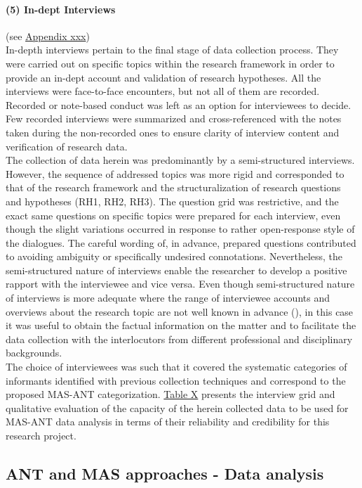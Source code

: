 \documentclass[11pt]{report}
\begin{document}
\paragraph{(5) In-dept Interviews}
(see \href{}{Appendix xxx})
\\
In-depth interviews pertain to the final stage of data collection process. They were carried out on specific topics within the research framework in order to provide an in-dept account and validation of research hypotheses. All the interviews were face-to-face encounters, but not all of them are recorded. Recorded or note-based conduct was left as an option for interviewees to decide. Few recorded interviews were summarized and cross-referenced with the notes taken during the non-recorded ones to ensure clarity of interview content and verification of research data.
\\
The collection of data herein was predominantly by a semi-structured interviews. However, the sequence of addressed topics was more rigid and corresponded to that of the research framework and the structuralization of research questions and hypotheses (RH1, RH2, RH3). The question grid was restrictive, and the exact same questions on specific topics were prepared for each interview, even though the slight variations occurred in response to rather open-response style of the dialogues. The careful wording of, in advance, prepared questions contributed to avoiding ambiguity or specifically undesired connotations. Nevertheless, the semi-structured nature of interviews enable the researcher to develop a positive rapport with the interviewee and vice versa. Even though semi-structured nature of interviews is more adequate where the range of interviewee accounts and overviews about the research topic are not well known in advance (\cite{King 1994}), in this case it was useful to obtain the factual  information on the matter and to facilitate the data collection with the interlocutors from different professional and disciplinary backgrounds. 
\\
The choice of interviewees was such that it covered the systematic categories of informants identified with previous collection techniques and correspond to the proposed MAS-ANT categorization. \href{}{Table X} presents the interview grid and qualitative evaluation of the capacity of the herein collected data to be used for MAS-ANT data analysis in terms of their reliability and credibility for this research project.

\subsection{ANT and MAS approaches - Data analysis}
\end{document}
